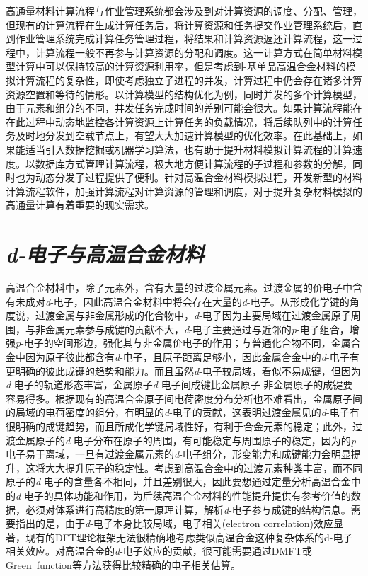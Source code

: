 高通量材料计算流程与作业管理系统都会涉及到对计算资源的调度、分配、管理，但现有的计算流程在生成计算任务后，将计算资源和任务提交作业管理系统后，直到作业管理系统完成计算任务管理过程，将结果和计算资源返还计算流程，这一过程中，计算流程一般不再参与计算资源的分配和调度。这一计算方式在简单材料模型计算中可以保持较高的计算资源利用率，但是考虑到-基单晶高温合金材料的模拟计算流程的复杂性，即使考虑独立子进程的并发，计算过程中仍会存在诸多计算资源空置和等待的情形。以计算模型的结构优化为例，同时并发的多个计算模型，由于元素和组分的不同，并发任务完成时间的差别可能会很大。如果计算流程能在在此过程中动态地监控各计算资源上计算任务的负载情况，将后续队列中的计算任务及时地分发到空载节点上，有望大大加速计算模型的优化效率。在此基础上，如果能适当引入数据挖掘或机器学习算法，也有助于提升材料模拟计算流程的计算速度。以数据库方式管理计算流程，极大地方便计算流程的子过程和参数的分解，同时也为动态分发子过程提供了便利。针对高温合金材料模拟过程，开发新型的材料计算流程软件，加强计算流程对计算资源的管理和调度，对于提升复杂材料模拟的高通量计算有着重要的现实需求。

\section{\it{d}-电子与高温合金材料}
高温合金材料中，除了元素外，含有大量的过渡金属元素。过渡金属的价电子中含有未成对\textit{d}-电子，因此高温合金材料中将会存在大量的\textit{d}-电子。从形成化学键的角度说，过渡金属与非金属形成的化合物中，\textit{d}-电子因为主要局域在过渡金属原子周围，与非金属元素参与成键的贡献不大，\textit{d}-电子主要通过与近邻的\textit{p}-电子组合，增强\textit{p}-电子的空间形边，强化其与非金属价电子的作用；与普通化合物不同，金属合金中因为原子彼此都含有\textit{d}-电子，且原子距离足够小，因此金属合金中的\textit{d}-电子有更明确的彼此成键的趋势和能力。而且虽然\textit{d}-电子较局域，看似不易成键，但因为\textit{d}-电子的轨道形态丰富，金属原子\textit{d}-电子间成键比金属原子-非金属原子的成键要容易得多。根据现有的高温合金原子间电荷密度分布分析也不难看出，金属原子间的局域的电荷密度的组分，有明显的\textit{d}-电子的贡献，这表明过渡金属见的\textit{d}-电子有很明确的成键趋势，而且所成化学键局域性好，有利于合金元素的稳定；此外，过渡金属原子的\textit{d}-电子分布在原子的周围，有可能稳定与周围原子的稳定，因为的\textit{p}-电子易于离域，一旦有过渡金属元素的\textit{d}-电子组分，形变能力和成键能力会明显提升，这将大大提升原子的稳定性。考虑到高温合金中的过渡元素种类丰富，而不同原子的\textit{d}-电子的含量各不相同，并且差别很大，因此要想通过定量分析高温合金中的\textit{d}-电子的具体功能和作用，为后续高温合金材料的性能提升提供有参考价值的数据，必须对体系进行高精度的第一原理计算，解析\textit{d}-电子参与成键的结构信息。需要指出的是，由于\textit{d}-电子本身比较局域，电子相关(\textrm{electron correlation})效应显著，现有的\textrm{DFT}理论框架无法很精确地考虑类似高温合金这种复杂体系的\textrm{d}-电子相关效应。对高温合金的\textit{d}-电子效应的贡献，很可能需要通过\textrm{DMFT}或\textrm{Green~function}等方法获得比较精确的电子相关估算。

